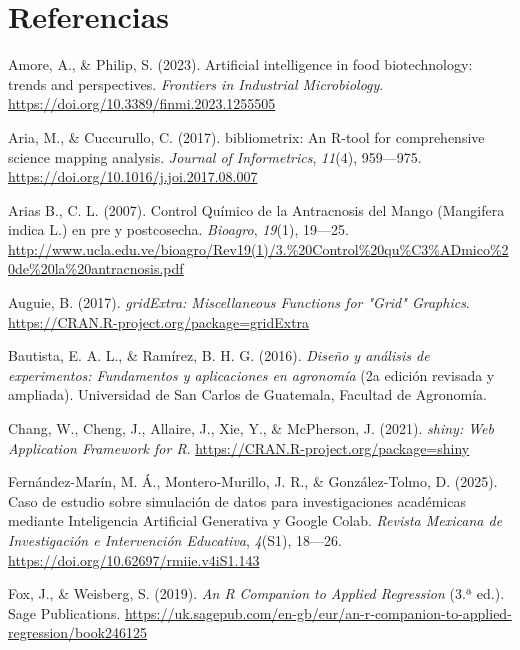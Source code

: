 \documentclass[
  spanish,
  letterpaper,
  DIV=11,
  numbers=noendperiod]{scrreprt}
\newlength{\cslhangindent}
\newenvironment{CSLReferences}[2] %
 {\begin{list}{}{%
  \setlength{\itemindent}{0pt}
  \setlength{\leftmargin}{0pt}
  \setlength{\parsep}{0pt}
  \ifodd #1
   \setlength{\leftmargin}{\cslhangindent}
   \setlength{\itemindent}{-1\cslhangindent}
  \fi
  \setlength{\itemsep}{#2\baselineskip}}}
 {\end{list}}
\begin{document}
\chapter*{Referencias}\label{referencias}


\label{refs}
\begin{CSLReferences}{1}{0}
Amore, A., \& Philip, S. (2023). Artificial intelligence in food
biotechnology: trends and perspectives. \emph{Frontiers in Industrial
Microbiology}. \url{https://doi.org/10.3389/finmi.2023.1255505}

Aria, M., \& Cuccurullo, C. (2017). {bibliometrix: An R-tool for
comprehensive science mapping analysis}. \emph{Journal of Informetrics},
\emph{11}(4), 959---975. \url{https://doi.org/10.1016/j.joi.2017.08.007}

Arias B., C. L. (2007). Control Qu{í}mico de la Antracnosis del Mango
({Mangifera indica L.}) en pre y postcosecha. \emph{Bioagro},
\emph{19}(1), 19---25.
\url{http://www.ucla.edu.ve/bioagro/Rev19(1)/3.\%20Control\%20qu\%C3\%ADmico\%20de\%20la\%20antracnosis.pdf}

Auguie, B. (2017). \emph{{gridExtra: Miscellaneous Functions for "Grid"
Graphics}}. \url{https://CRAN.R-project.org/package=gridExtra}

Bautista, E. A. L., \& Ramírez, B. H. G. (2016). \emph{Diseño y análisis
de experimentos: Fundamentos y aplicaciones en agronomía} (2a edición
revisada y ampliada). Universidad de San Carlos de Guatemala, Facultad
de Agronomía.

Chang, W., Cheng, J., Allaire, J., Xie, Y., \& McPherson, J. (2021).
\emph{shiny: Web Application Framework for R}.
\url{https://CRAN.R-project.org/package=shiny}

Fernández-Marín, M. Á., Montero-Murillo, J. R., \& González-Tolmo, D.
(2025). Caso de estudio sobre simulación de datos para investigaciones
académicas mediante Inteligencia Artificial Generativa y Google Colab.
\emph{Revista Mexicana de Investigación e Intervención Educativa},
\emph{4}(S1), 18---26. \url{https://doi.org/10.62697/rmiie.v4iS1.143}

Fox, J., \& Weisberg, S. (2019). \emph{{An R Companion to Applied
Regression}} (3.ª ed.). Sage Publications.
\url{https://uk.sagepub.com/en-gb/eur/an-r-companion-to-applied-regression/book246125}


\end{CSLReferences}
\end{document}
